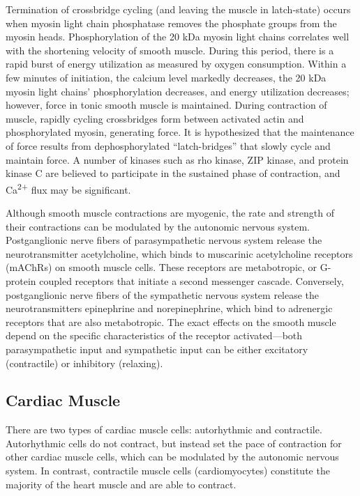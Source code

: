 Termination of crossbridge cycling (and leaving the muscle in latch-state) occurs when myosin light chain phosphatase removes the phosphate groups from the myosin heads. Phosphorylation of the 20 kDa myosin light chains correlates well with the shortening velocity of smooth muscle. During this period, there is a rapid burst of energy utilization as measured by oxygen consumption. Within a few minutes of initiation, the calcium level markedly decreases, the 20 kDa myosin light chains' phosphorylation decreases, and energy utilization decreases; however, force in tonic smooth muscle is maintained. During contraction of muscle, rapidly cycling crossbridges form between activated actin and phosphorylated myosin, generating force. It is hypothesized that the maintenance of force results from dephosphorylated ``latch-bridges'' that slowly cycle and maintain force. A number of kinases such as rho kinase, ZIP kinase, and protein kinase C are believed to participate in the sustained phase of contraction, and Ca\textsuperscript{2+} flux may be significant.

Although smooth muscle contractions are myogenic, the rate and strength of their contractions can be modulated by the autonomic nervous system. Postganglionic nerve fibers of parasympathetic nervous system release the neurotransmitter acetylcholine, which binds to muscarinic acetylcholine receptors (mAChRs) on smooth muscle cells. These receptors are metabotropic, or G-protein coupled receptors that initiate a second messenger cascade. Conversely, postganglionic nerve fibers of the sympathetic nervous system release the neurotransmitters epinephrine and norepinephrine, which bind to adrenergic receptors that are also metabotropic. The exact effects on the smooth muscle depend on the specific characteristics of the receptor activated---both parasympathetic input and sympathetic input can be either excitatory (contractile) or inhibitory (relaxing).

\hypertarget{cardiac-muscle}{%
\subsection{Cardiac Muscle}\label{cardiac-muscle}}

There are two types of cardiac muscle cells: autorhythmic and contractile. Autorhythmic cells do not contract, but instead set the pace of contraction for other cardiac muscle cells, which can be modulated by the autonomic nervous system. In contrast, contractile muscle cells (cardiomyocytes) constitute the majority of the heart muscle and are able to contract.

